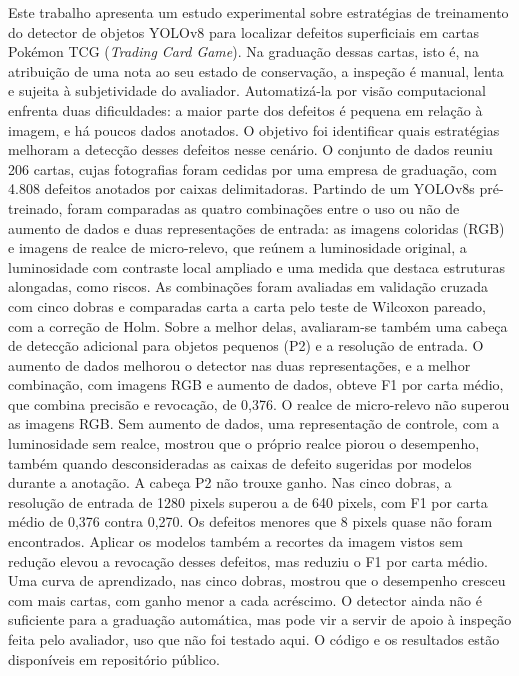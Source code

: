 \documentclass[
    12pt,                %
    openright,           %
    oneside,             %
    a4paper,             %
    english,             %
    brazil               %
]{abntex2}
\begin{document}
\pretextual

\imprimircapa

\imprimirfolhaderosto

\begin{resumo}
Este trabalho apresenta um estudo experimental sobre estratégias de
treinamento do detector de objetos YOLOv8 para localizar defeitos
superficiais em cartas Pokémon TCG (\textit{Trading Card Game}). Na
graduação dessas cartas, isto é, na atribuição de uma nota ao seu
estado de conservação, a inspeção é manual, lenta e sujeita à
subjetividade do avaliador. Automatizá-la por visão computacional
enfrenta duas dificuldades: a maior parte dos defeitos é pequena em
relação à imagem, e há poucos dados anotados. O objetivo foi
identificar quais estratégias melhoram a detecção desses
defeitos nesse cenário. O conjunto de dados reuniu 206 cartas, cujas
fotografias foram cedidas por uma empresa de graduação, com 4.808
defeitos anotados por caixas delimitadoras. Partindo de um YOLOv8s pré-treinado,
foram comparadas as quatro combinações entre o uso ou não de aumento de
dados e duas representações de entrada: as imagens coloridas (RGB) e
imagens de realce de micro-relevo, que reúnem a luminosidade original, a
luminosidade com contraste local ampliado e uma medida que destaca
estruturas alongadas, como riscos. As combinações foram avaliadas em
validação cruzada com cinco dobras e comparadas carta a carta pelo
teste de Wilcoxon pareado, com a correção de Holm. Sobre a melhor delas, avaliaram-se também uma cabeça de
detecção adicional para objetos pequenos (P2) e a resolução de entrada.
O aumento de dados melhorou o detector nas duas representações, e a
melhor combinação, com imagens RGB e aumento de dados, obteve F1 por carta médio, que combina precisão e revocação,
de 0,376. O
realce de micro-relevo não superou as imagens RGB. Sem aumento de
dados, uma representação de controle, com a luminosidade sem realce,
mostrou que o próprio realce piorou o desempenho, também quando
desconsideradas as caixas de defeito sugeridas por modelos durante a
anotação. A cabeça P2 não trouxe ganho. Nas
cinco dobras, a resolução de entrada de 1280 pixels superou a de 640
pixels, com F1 por carta
médio de 0,376 contra 0,270. Os defeitos menores que 8 pixels quase
não foram encontrados. Aplicar os modelos também a recortes
da imagem vistos sem redução elevou a revocação desses
defeitos, mas reduziu o F1 por carta médio. Uma curva de aprendizado,
nas cinco dobras, mostrou que o desempenho cresceu com mais cartas, com
ganho menor a cada acréscimo. O detector ainda não é suficiente
para a graduação automática, mas pode vir a servir de apoio à inspeção
feita pelo avaliador, uso que não foi testado aqui.
O código e os resultados estão disponíveis em repositório público.


\end{resumo}
\end{document}
